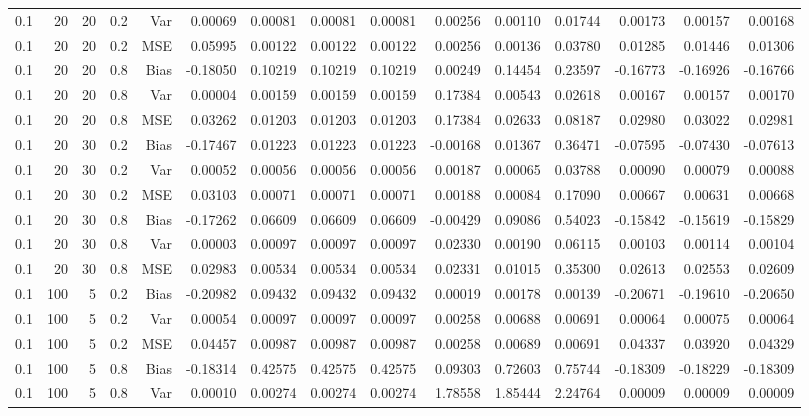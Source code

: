 \begin{table}[!htbp]
\begin{tabular}{lrrrrrrrrrrrrrr}
0.1 &  20 & 20 & 0.2 & Var & 0.00069 & 0.00081 & 0.00081 & 0.00081 & 0.00256 & 0.00110 & 0.01744 & 0.00173 & 0.00157 & 0.00168 \\
0.1 &  20 & 20 & 0.2 & MSE & 0.05995 & 0.00122 & 0.00122 & 0.00122 & 0.00256 & 0.00136 & 0.03780 & 0.01285 & 0.01446 & 0.01306 \\
0.1 &  20 & 20 & 0.8 & Bias & -0.18050 & 0.10219 & 0.10219 & 0.10219 & 0.00249 & 0.14454 & 0.23597 & -0.16773 & -0.16926 & -0.16766 \\
0.1 &  20 & 20 & 0.8 & Var & 0.00004 & 0.00159 & 0.00159 & 0.00159 & 0.17384 & 0.00543 & 0.02618 & 0.00167 & 0.00157 & 0.00170 \\
0.1 &  20 & 20 & 0.8 & MSE & 0.03262 & 0.01203 & 0.01203 & 0.01203 & 0.17384 & 0.02633 & 0.08187 & 0.02980 & 0.03022 & 0.02981 \\
0.1 &  20 & 30 & 0.2 & Bias & -0.17467 & 0.01223 & 0.01223 & 0.01223 & -0.00168 & 0.01367 & 0.36471 & -0.07595 & -0.07430 & -0.07613 \\
0.1 &  20 & 30 & 0.2 & Var & 0.00052 & 0.00056 & 0.00056 & 0.00056 & 0.00187 & 0.00065 & 0.03788 & 0.00090 & 0.00079 & 0.00088 \\
0.1 &  20 & 30 & 0.2 & MSE & 0.03103 & 0.00071 & 0.00071 & 0.00071 & 0.00188 & 0.00084 & 0.17090 & 0.00667 & 0.00631 & 0.00668 \\
0.1 &  20 & 30 & 0.8 & Bias & -0.17262 & 0.06609 & 0.06609 & 0.06609 & -0.00429 & 0.09086 & 0.54023 & -0.15842 & -0.15619 & -0.15829 \\
0.1 &  20 & 30 & 0.8 & Var & 0.00003 & 0.00097 & 0.00097 & 0.00097 & 0.02330 & 0.00190 & 0.06115 & 0.00103 & 0.00114 & 0.00104 \\
0.1 &  20 & 30 & 0.8 & MSE & 0.02983 & 0.00534 & 0.00534 & 0.00534 & 0.02331 & 0.01015 & 0.35300 & 0.02613 & 0.02553 & 0.02609 \\
0.1 & 100 &  5 & 0.2 & Bias & -0.20982 & 0.09432 & 0.09432 & 0.09432 & 0.00019 & 0.00178 & 0.00139 & -0.20671 & -0.19610 & -0.20650 \\
0.1 & 100 &  5 & 0.2 & Var & 0.00054 & 0.00097 & 0.00097 & 0.00097 & 0.00258 & 0.00688 & 0.00691 & 0.00064 & 0.00075 & 0.00064 \\
0.1 & 100 &  5 & 0.2 & MSE & 0.04457 & 0.00987 & 0.00987 & 0.00987 & 0.00258 & 0.00689 & 0.00691 & 0.04337 & 0.03920 & 0.04329 \\
0.1 & 100 &  5 & 0.8 & Bias & -0.18314 & 0.42575 & 0.42575 & 0.42575 & 0.09303 & 0.72603 & 0.75744 & -0.18309 & -0.18229 & -0.18309 \\
0.1 & 100 &  5 & 0.8 & Var & 0.00010 & 0.00274 & 0.00274 & 0.00274 & 1.78558 & 1.85444 & 2.24764 & 0.00009 & 0.00009 & 0.00009 \\

\end{tabular}
\end{table}
